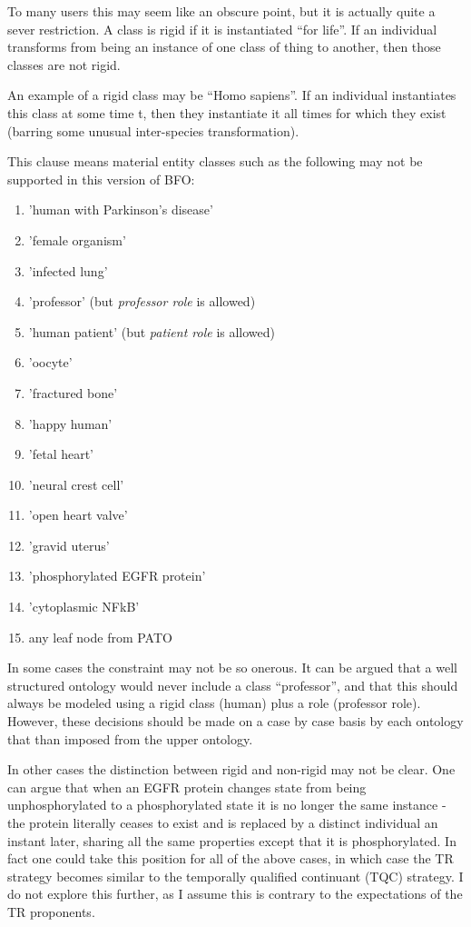 \documentclass{bioinfo}
\begin{document}
To many users this may seem like an obscure point, but it is actually
quite a sever restriction. A class is rigid if it is instantiated
``for life''. If an individual transforms from being an instance of
one class of thing to another, then those classes are not rigid.

An example of a rigid class may be ``Homo sapiens''. If an individual
instantiates this class at some time t, then they instantiate it all
times for which they exist (barring some unusual inter-species
transformation).

This clause means material entity classes such as the following may
not be supported in this version of BFO:

\begin{enumerate}

  \item 'human with Parkinson's disease'
  \item 'female organism'
  \item 'infected lung'
  \item 'professor' (but \emph{professor role} is allowed)
  \item 'human patient' (but \emph{patient role} is allowed)
  \item 'oocyte'
  \item 'fractured bone'
  \item 'happy human'
  \item 'fetal heart'
  \item 'neural crest cell'
  \item 'open heart valve'
  \item 'gravid uterus'
  \item 'phosphorylated EGFR protein'
  \item 'cytoplasmic NFkB'
  \item any leaf node from PATO

\end{enumerate}

In some cases the constraint may not be so onerous. It can be argued
that a well structured ontology would never include a class
``professor'', and that this should always be modeled using a rigid
class (human) plus a role (professor role). However, these decisions
should be made on a case by case basis by each ontology that than
imposed from the upper ontology.

In other cases the distinction between rigid and non-rigid may not be
clear. One can argue that when an EGFR protein changes state from
being unphosphorylated to a phosphorylated state it is no longer the
same instance - the protein literally ceases to exist and is replaced
by a distinct individual an instant later, sharing all the same
properties except that it is phosphorylated. In fact one could take
this position for all of the above cases, in which case the TR
strategy becomes similar to the temporally qualified continuant (TQC)
strategy. I do not explore this further, as I assume this is contrary
to the expectations of the TR proponents.
\end{document}
